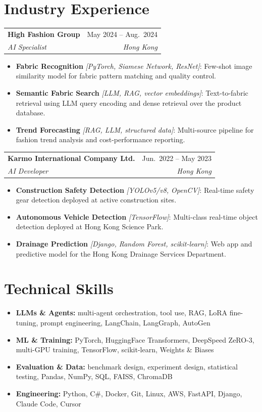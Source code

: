 \documentclass[letterpaper,10pt]{article}
\makeatletter
\newcommand{\entry}[4]{%
  \begin{tabular*}{\textwidth}{@{}l@{\extracolsep{\fill}}r@{}}
    \textbf{#1} & \small #2 \\
    \small\textit{#3} & \small\textit{#4}
  \end{tabular*}\par\vspace{1pt}}
\newenvironment{cvlist}
  {\begin{itemize}[leftmargin=0.16in, label=\textbullet, itemsep=2pt, parsep=0pt, topsep=2pt]\small}
  {\end{itemize}\vspace{3pt}}
\newcommand{\proj}[3]{\item \textbf{#1} \textit{[#2]}: #3}
\makeatother
\begin{document}
\section{Industry Experience}

\entry{High Fashion Group}{May 2024 -- Aug.\ 2024}{AI Specialist}{Hong Kong}
\begin{cvlist}
  \proj{Fabric Recognition}{PyTorch, Siamese Network, ResNet}{Few-shot image similarity model for fabric pattern matching and quality control.}
  \proj{Semantic Fabric Search}{LLM, RAG, vector embeddings}{Text-to-fabric retrieval using LLM query encoding and dense retrieval over the product database.}
  \proj{Trend Forecasting}{RAG, LLM, structured data}{Multi-source pipeline for fashion trend analysis and cost-performance reporting.}
\end{cvlist}

\entry{Karmo International Company Ltd.}{Jun.\ 2022 -- May 2023}{AI Developer}{Hong Kong}
\begin{cvlist}
  \proj{Construction Safety Detection}{YOLOv5/v8, OpenCV}{Real-time safety gear detection deployed at active construction sites.}
  \proj{Autonomous Vehicle Detection}{TensorFlow}{Multi-class real-time object detection deployed at Hong Kong Science Park.}
  \proj{Drainage Prediction}{Django, Random Forest, scikit-learn}{Web app and predictive model for the Hong Kong Drainage Services Department.}
\end{cvlist}

\section{Technical Skills}
\begin{cvlist}
  \item \textbf{LLMs \& Agents:} multi-agent orchestration, tool use, RAG, LoRA fine-tuning, prompt engineering, LangChain, LangGraph, AutoGen
  \item \textbf{ML \& Training:} PyTorch, HuggingFace Transformers, DeepSpeed ZeRO-3, multi-GPU training, TensorFlow, scikit-learn, Weights \& Biases
  \item \textbf{Evaluation \& Data:} benchmark design, experiment design, statistical testing, Pandas, NumPy, SQL, FAISS, ChromaDB
  \item \textbf{Engineering:} Python, C\#, Docker, Git, Linux, AWS, FastAPI, Django, Claude Code, Cursor
\end{cvlist}
\end{document}
